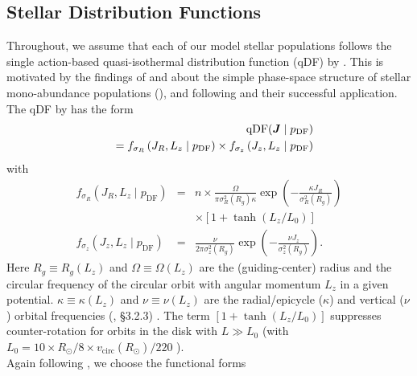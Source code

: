 \subsection{Stellar Distribution Functions} \label{sec:qDF}

Throughout, we assume that each of our model stellar populations follows the single action-based quasi-isothermal distribution function (qDF) by \citet{2011MNRAS.413.1889B}. This is motivated by the findings of \citet{bov12b,bov12c,2012ApJ...753..148B} and \citet{2013MNRAS.434..652T} about the simple phase-space structure of stellar mono-abundance populations (\MAP{}), and following \citet{2013ApJ...779..115B} and their successful application. The qDF by \citet{2011MNRAS.413.1889B} has the form
\begin{eqnarray}
&&\text{qDF}(\boldsymbol{J} \mid p_\text{DF}) \nonumber\\
&&= f_{\sigma_R}\left(J_R,L_z \mid p_\text{DF}\right) \times f_{\sigma_z}\left(J_z,L_z \mid p_\text{DF}\right)\label{eq:df_general}\end{eqnarray}
with
\begin{eqnarray}
f_{\sigma_R}\left(J_R,L_z \mid p_\text{DF}\right) &=& n \times \frac{\Omega}{\pi\sigma_R^2(R_g) \kappa}\exp\left(-\frac{\kappa J_R}{\sigma_R^2(R_g)} \right) \nonumber\\
&& \times \left[1+\tanh\left(L_z/L_0\right) \right]\\
f_{\sigma_z}\left(J_z,L_z \mid p_\text{DF} \right) &=& \frac{\nu}{2 \pi \sigma_z^2(R_g)} \exp\left( -\frac{\nu J_z}{\sigma_z^2(R_g)} \right).
\end{eqnarray}
Here $R_g \equiv R_g(L_z)$ and $\Omega\equiv \Omega(L_z)$ are the (guiding-center) radius and the circular frequency of the circular orbit with angular momentum $L_z$ in a given potential. $\kappa\equiv \kappa(L_z)$ and $\nu\equiv \nu(L_z)$ are the radial/epicycle ($\kappa$) and vertical ($\nu$) orbital frequencies (\citealt{2008gady.book.....B}, \S 3.2.3) . The term $\left[1+\tanh\left(L_z/L_0\right) \right]$ suppresses counter-rotation for orbits in the disk with $L \gg L_0$ (with $L_0 = 10 \times R_\odot/8 \times v_\text{circ}(R_\odot)/220$ ).
\\Again following \citet{2013ApJ...779..115B}, we choose the functional forms
